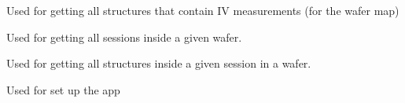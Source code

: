 \documentclass[letterpaper,10pt,english]{sphinxmanual}
\begin{document}

\begin{fulllineitems}
\label{\detokenize{app:app.get_plot_structures_server}}
\pysigstartsignatures
{}
\pysigstopsignatures
\sphinxAtStartPar
Used for getting all structures that contain I\sphinxhyphen{}V measurements (for the wafer map)

\end{fulllineitems}


\begin{fulllineitems}
\label{\detokenize{app:app.get_sessions_server}}
\pysigstartsignatures
{}
\pysigstopsignatures
\sphinxAtStartPar
Used for getting all sessions inside a given wafer.

\end{fulllineitems}


\begin{fulllineitems}
\label{\detokenize{app:app.get_structures_json}}
\pysigstartsignatures
{}
\pysigstopsignatures
\sphinxAtStartPar
Used for getting all structures inside a given session in a wafer.

\end{fulllineitems}


\begin{fulllineitems}
\label{\detokenize{app:app.index}}
\pysigstartsignatures
{}
\pysigstopsignatures
\sphinxAtStartPar
Used for set up the app

\end{fulllineitems}
\end{document}
